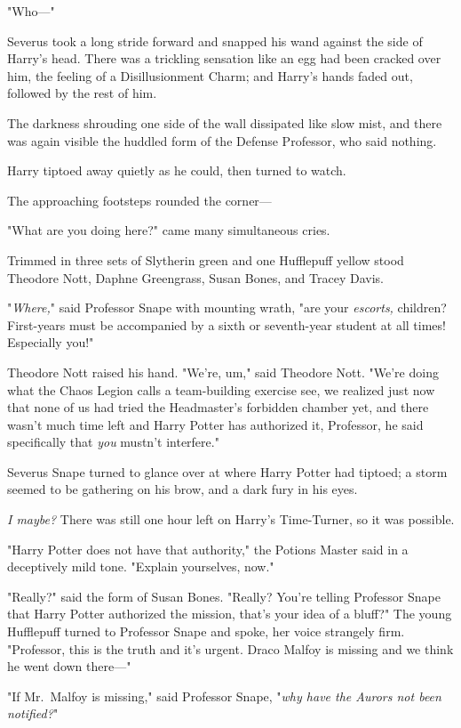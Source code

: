 "Who\mbox{---}"

Severus took a long stride forward and snapped his wand against the side of
Harry's head. There was a trickling sensation like an egg had been cracked over
him, the feeling of a Disillusionment Charm; and Harry's hands faded out,
followed by the rest of him.

The darkness shrouding one side of the wall dissipated like slow mist, and
there was again visible the huddled form of the Defense Professor, who said
nothing.

Harry tiptoed away quietly as he could, then turned to watch.

The approaching footsteps rounded the corner---

"What are you doing here?" came many simultaneous cries.

Trimmed in three sets of Slytherin green and one Hufflepuff yellow stood
Theodore Nott, Daphne Greengrass, Susan Bones, and Tracey Davis.

"\emph{Where,}" said Professor Snape with mounting wrath, "are your
\emph{escorts,} children? First-years must be accompanied by a sixth or
seventh-year student at all times! Especially you!"

Theodore Nott raised his hand. "We're, um," said Theodore Nott. "We're doing
what the Chaos Legion calls a team-building exercise{\el} see, we realized
just now that none of us had tried the Headmaster's forbidden chamber yet, and
there wasn't much time left{\el} and Harry Potter has authorized it,
Professor, he said specifically that \emph{you} mustn't interfere."

Severus Snape turned to glance over at where Harry Potter had tiptoed; a storm
seemed to be gathering on his brow, and a dark fury in his eyes.

\emph{I{\el} maybe?} There was still one hour left on Harry's Time-Turner,
so it was possible.

"Harry Potter does not have that authority," the Potions Master said in a
deceptively mild tone. "Explain yourselves, now."

"Really?" said the form of Susan Bones. "Really? You're telling Professor Snape
that Harry Potter authorized the mission, that's your idea of a bluff?" The
young Hufflepuff turned to Professor Snape and spoke, her voice strangely firm.
"Professor, this is the truth and it's urgent. Draco Malfoy is missing and we
think he went down there\mbox{---}"

"If Mr.~Malfoy is missing," said Professor Snape, "\emph{why have the Aurors
not been notified?}"


